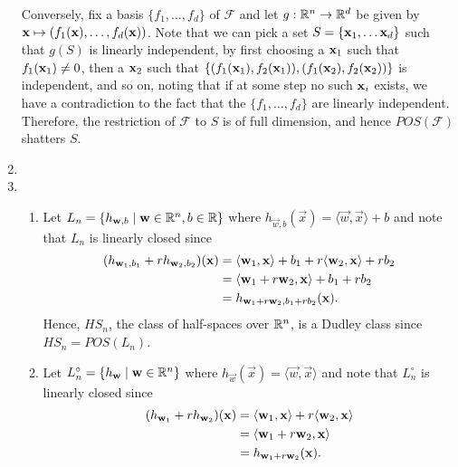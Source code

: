 \begin{ex}
\begin{enumerate}
          Conversely, fix a basis $\{f_1,\ldots,f_d\}$ of $\mathcal{F}$ and let
          $g:\mathbb{R}^n \to \mathbb{R}^d$ be given by $\mathbf{x}\mapsto (f_1(\mathbf{x}),\ldots,f_d(\mathbf{x}))$.
          Note that we can pick a set $S=\{\mathbf{x}_1,\ldots \mathbf{x}_d\}$ such
          that $g(S)$ is linearly independent, by first choosing a $\mathbf{x}_1$ such
          that $f_1(\mathbf{x}_1)\neq 0$, then a $\mathbf{x}_2$ such that
          $\{(f_1(\mathbf{x}_1), f_2(\mathbf{x}_1)), (f_1(\mathbf{x}_2), f_2(\mathbf{x}_2))\}$ is independent,
          and so on, noting that if at some step no such $\mathbf{x}_i$ exists, we have
          a contradiction to the fact that the $\{f_1, \ldots,f_d\}$ are
          linearly independent. Therefore, the restriction of $\mathcal{F}$
          to $S$ is of full dimension, and hence $POS(\mathcal{F})$ shatters
          $S$.
    \item
    \item[]
          \begin{enumerate}[1.]
            \item Let $L_n=\{h_{\mathbf{w},b} \mid \mathbf{w}\in\mathbb{R}^n, b\in \mathbb{R}\}$
                  where
                  $h_{\vec{w},b}(\vec{x}) =\langle\vec{w},\vec{x}\rangle + b$
                  and note that $L_n$ is linearly closed since
                  \begin{align*}
                    (h_{\mathbf{w}_1,b_1}+rh_{\mathbf{w}_2,b_2})(\mathbf{x})
                     & =\langle\mathbf{w}_1,\mathbf{x}\rangle + b_1
                    +r\langle\mathbf{w}_2,\mathbf{x}\rangle + rb_2        \\
                     & =\langle\mathbf{w}_1+r\mathbf{w}_2, \mathbf{x}\rangle
                    + b_1 + rb_2                               \\
                     & =h_{\mathbf{w}_1+r\mathbf{w}_2,b_1+rb_2}(\mathbf{x}).
                  \end{align*}
                  Hence, $HS_n$, the class of half-spaces over $\mathbb{R}^n$,
                  is a Dudley class since $HS_n=POS(L_n)$.
            \item Let $L^\circ_n=\{h_{\mathbf{w}} \mid \mathbf{w}\in\mathbb{R}^n \}$
                  where $h_{\vec{w}}(\vec{x})=\langle\vec{w},\vec{x}\rangle$
                  and note that $L^\circ_n$ is linearly closed since
                  \begin{align*}
                    (h_{\vec{w}_1}+rh_{\vec{w}_2})(\x)
                     & =\langle\vec{w}_1,\x\rangle
                    +r\langle\vec{w}_2,\x\rangle              \\
                     & =\langle\vec{w}_1+r\vec{w}_2,\x\rangle \\
                     & =h_{\vec{w}_1+r\vec{w}_2}(\x).

\end{align*}
\end{enumerate}
\end{enumerate}
\end{ex}
